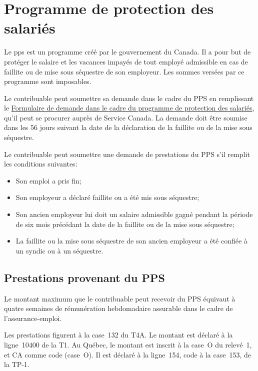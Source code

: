 


\section{Programme de protection des salariés}
\begin{intro}
	Le \acrfull{pps} est un programme créé par le gouvernement du Canada. Il a pour but de protéger le salaire et les vacances impayés de tout employé admissible en cas de faillite ou de mise sous séquestre de son employeur. Les sommes versées par ce programme sont imposables.
\end{intro}

Le contribuable peut soumettre sa demande dans le cadre du PPS en remplissant le \href{https://srv217.services.gc.ca/ihst4/Intro.aspx?cid=08874c44-77de-42ca-8a48-d933ddbd3de3&lc=fra}{Formulaire de demande dans le cadre du programme de protection des salariés}, qu'il peut se procurer auprès de Service Canada. La demande doit être soumise dans les 56 jours suivant la date de la déclaration de la faillite ou de la mise sous séquestre.

Le contribuable peut soumettre une demande de prestations du PPS s'il remplit les conditions suivantes:
\begin{itemize}
	\item Son emploi a pris fin;
	\item Son employeur a déclaré faillite ou a été mis sous séquestre;
	\item Son ancien employeur lui doit un salaire admissible gagné pendant la période de six mois précédant la date de la faillite ou de la mise sous séquestre;
	\item La faillite ou la mise sous séquestre de son ancien employeur a été confiée à un syndic ou à un séquestre.
\end{itemize}


\subsection{Prestations provenant du PPS}
Le montant maximum que le contribuable peut recevoir du PPS équivaut à quatre semaines de rémunération hebdomadaire assurable dans le cadre de l'assurance-emploi.

Les prestations figurent à la case~132 du T4A. Le montant est déclaré à la ligne~10400 de la T1. Au Québec, le montant est inscrit à la case~O du relevé~1, et \og CA \fg{} comme code (case~O). Il est déclaré à la ligne~154, code  \fg{} à la case~153, de la
TP-1. 


